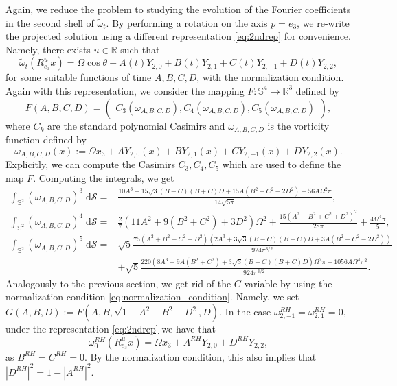 \documentclass{amsart}
\def\R{{\mathbb{R}}}
\def\erre{{\mathbb{R}}}
\begin{document}
Again, we reduce the problem to studying the evolution of the Fourier coefficients in the second shell of $\tilde\omega_t$. By performing a rotation on the axis $p=e_3$, we re-write the projected solution using a different representation \eqref{eq:2ndrep} for convenience. Namely, there exists $u\in\R$ such that
\begin{equation}
    \tilde\omega_t(R^u_{e_3}x)=\Omega\cos\theta+ A(t)Y_{2,0} + B(t)Y_{2,1}+ C(t)Y_{2,-1} + D(t)Y_{2,2}, \label{eq:representation_2_first_two_shells}
\end{equation}
for some suitable functions of time $A,B,C,D$, with the normalization condition. Again with this representation, we consider the mapping $F:\mathbb{S}^4\to\erre^3$ defined by
\begin{equation*}
    F(A,B,C,D)=\begin{pmatrix}C_3(\omega_{A,B,C,D}),C_4(\omega_{A,B,C,D}),C_5(\omega_{A,B,C,D})\end{pmatrix},
\end{equation*}
where $C_k$ are the standard polynomial Casimirs and $\omega_{A,B,C,D}$ is the vorticity function defined by
\begin{equation*}
    \omega_{A,B,C,D}(x):=\Omega x_3 + A Y_{2,0}(x) + B Y_{2,1}(x) + C Y_{2,-1}(x) + D Y_{2,2}(x).
\end{equation*}
Explicitly, we can compute the Casimirs $C_3,C_4,C_5$ which are used to define the map $F$. Computing the integrals, we get
\begin{align*}
    \int_{\mathbb{S}^2}(\omega_{A,B,C,D})^3\;\mathrm{d}\mathcal{S}=&\frac{10 A^{3} + 15 \sqrt{3} (B - C) (B + C) D + 15 A \left( B^{2} + C^{2} - 2 D^{2} \right) + 56 A \Omega^{2} \pi}{14 \sqrt{5 \pi}}, \\
    \int_{\mathbb{S}^2}(\omega_{A,B,C,D})^4\;\mathrm{d}\mathcal{S}=&\frac{2}{7} \left( 11 A^{2} + 9 \left( B^{2} + C^{2} \right) + 3 D^{2} \right) \Omega^{2} + \frac{15 \left( A^{2} + B^{2} + C^{2} + D^{2} \right)^{2}}{28 \pi} + \frac{4 \Omega^{4} \pi}{5}, \\
    \int_{\mathbb{S}^2}(\omega_{A,B,C,D})^5\;\mathrm{d}\mathcal{S}=&\sqrt{5}\frac{75 (A^{2} + B^{2} + C^{2} + D^{2}) \left( 2 A^{3} + 3 \sqrt{3} (B - C)(B + C) D + 3 A \left( B^{2} + C^{2} - 2 D^{2} \right) \right)}{924 \pi^{3/2}}\\
    &+\sqrt{5}\frac{220 \left( 8 A^{3} + 9 A \left( B^{2} + C^{2} \right) + 3 \sqrt{3} (B - C)(B + C) D \right) \Omega^{2} \pi+ 1056 A \Omega^{4} \pi^{2}}{924 \pi^{3/2}}.
\end{align*}
Analogously to the previous section, we get rid of the $C$ variable by using the normalization condition \eqref{eq:normalization_condition}. Namely, we set $G(A,B,D):=F(A,B,\sqrt{1-A^2-B^2-D^2},D)$. In the case $\omega^{RH}_{2,-1}=\omega^{RH}_{2,1}=0$, under the representation \eqref{eq:2ndrep} we have that
$$
\omega^{RH}_0(R^u_{e_3}x)=\Omega x_3 + A^{RH} Y_{2,0}+ D^{RH} Y_{2,2},
$$
as $B^{RH}=C^{RH}=0$. By the normalization condition, this also implies that $|D^{RH}|^2=1-|A^{RH}|^2$.
\end{document}

